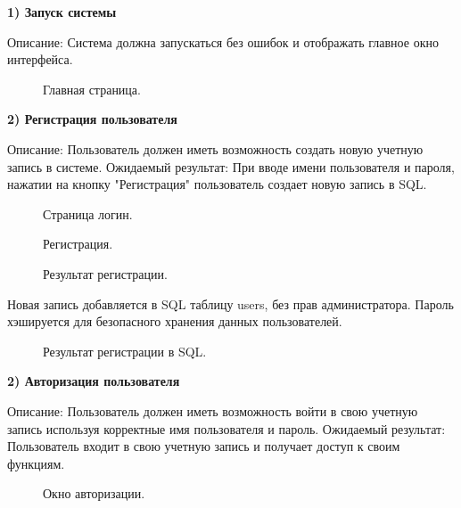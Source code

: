 \textbf{1) Запуск системы}

Описание: Система должна запускаться без ошибок и отображать главное окно интерфейса.

\begin{figure}[ht]
	\caption{Главная страница.}
	\label{storedf:index0}
\end{figure}

\newpage

\textbf{2) Регистрация пользователя}

Описание: Пользователь должен иметь возможность создать новую учетную запись в системе.
Ожидаемый результат:  При вводе имени пользователя и пароля, нажатии на кнопку "Регистрация" пользователь создает новую запись в SQL.

\begin{figure}[ht]
	\caption{Страница логин.}
	\label{storedf:login0}
\end{figure}

\begin{figure}[ht]
	\caption{Регистрация.}
	\label{storedf:loginus}
\end{figure}

\begin{figure}[ht]
	\caption{Результат регистрации.}
	\label{storedf:loginc}
\end{figure}

Новая запись добавляется в SQL таблицу users, без прав администратора. Пароль хэшируется для безопасного хранения данных пользователей.

\begin{figure}[ht]
	\caption{Результат регистрации в SQL.}
	\label{storedf:login1}
\end{figure}

\textbf{2) Авторизация пользователя}

Описание: Пользователь должен иметь возможность войти в свою учетную запись используя корректные имя пользователя и пароль.
Ожидаемый результат: Пользователь входит в свою учетную запись и получает доступ к своим функциям.

\begin{figure}[ht]
	\caption{Окно авторизации.}
	\label{storedf:loginad}
\end{figure}

